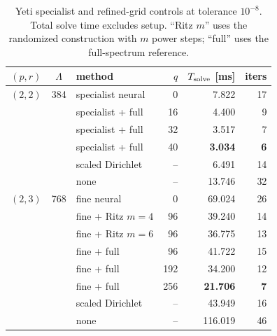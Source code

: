 \documentclass{article}
\theoremstyle{plain}
\numberwithin{equation}{section}
\begin{document}
\begin{table}[ht]
    \centering
    \caption{Yeti specialist and refined-grid controls at tolerance $10^{-8}$.
        Total solve time excludes setup.  ``Ritz $m$'' uses the randomized
        construction with $m$ power steps; ``full'' uses the full-spectrum reference.}
    \label{tab:nn-refined-correction}
    \small
    \begin{tabular}{cclrrr}
        \toprule
        $(p,r)$ & $\Lambda$ & method            & $q$ & $T_{\rm solve}$ [ms] & iters      \\
        \midrule
        $(2,2)$ & 384       & specialist neural & 0   & 7.822                & 17         \\
                &           & specialist + full & 16  & 4.400                & 9          \\
                &           & specialist + full & 32  & 3.517                & 7          \\
                &           & specialist + full & 40  & \textbf{3.034}       & \textbf{6} \\
                &           & scaled Dirichlet  & --  & 6.491                & 14         \\
                &           & none              & --  & 13.746               & 32         \\
        \midrule
        $(2,3)$ & 768       & fine neural       & 0   & 69.024               & 26         \\
                &           & fine + Ritz $m=4$ & 96  & 39.240               & 14         \\
                &           & fine + Ritz $m=6$ & 96  & 36.775               & 13         \\
                &           & fine + full       & 96  & 41.722               & 15         \\
                &           & fine + full       & 192 & 34.200               & 12         \\
                &           & fine + full       & 256 & \textbf{21.706}      & \textbf{7} \\
                &           & scaled Dirichlet  & --  & 43.949               & 16         \\
                &           & none              & --  & 116.019              & 46         \\
        \bottomrule
    \end{tabular}
\end{table}
\end{document}
